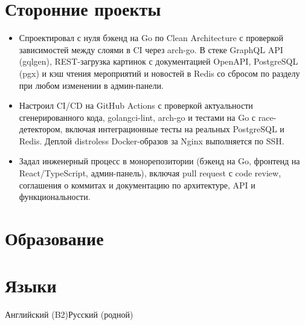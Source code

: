 \documentclass[10pt,a4paper]{article}
\begin{document}

\section*{Сторонние проекты}
\begin{itemize}
  \item Спроектировал с нуля бэкенд на Go по Clean Architecture с проверкой зависимостей между слоями в CI через arch-go. В стеке GraphQL API (gqlgen), REST-загрузка картинок с документацией OpenAPI, PostgreSQL (pgx) и кэш чтения мероприятий и новостей в Redis со сбросом по разделу при любом изменении в админ-панели.
  \item Настроил CI/CD на GitHub Actions с проверкой актуальности сгенерированного кода, golangci-lint, arch-go и тестами на Go с race-детектором, включая интеграционные тесты на реальных PostgreSQL и Redis. Деплой distroless Docker-образов за Nginx выполняется по SSH.
  \item Задал инженерный процесс в монорепозитории (бэкенд на Go, фронтенд на React/TypeScript, админ-панель), включая pull request с code review, соглашения о коммитах и документацию по архитектуре, API и функциональности.
\end{itemize}

\section*{Образование}


\section*{Языки}
Английский (B2)\cvsep Русский (родной)

\end{document}
